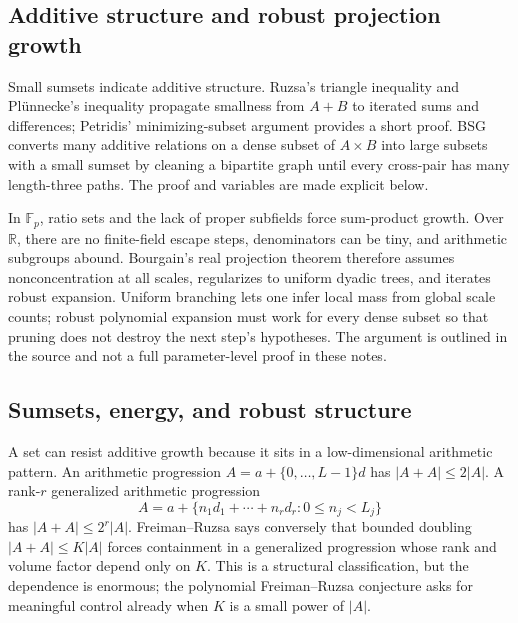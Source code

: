 \subsection{Additive structure and robust projection growth}\label{04-visual-computing-ii-ch033-additive-structure-and-robust-projection-growth}

Small sumsets indicate additive structure. Ruzsa's triangle inequality and Plünnecke's inequality propagate smallness from \(A+B\) to iterated sums and differences; Petridis' minimizing-subset argument provides a short proof. BSG converts many additive relations on a dense subset of \(A\times B\) into large subsets with a small sumset by cleaning a bipartite graph until every cross-pair has many length-three paths. The proof and variables are made explicit below.

In \(\mathbb F_p\), ratio sets and the lack of proper subfields force sum-product growth. Over \(\mathbb R\), there are no finite-field escape steps, denominators can be tiny, and arithmetic subgroups abound. Bourgain's real projection theorem therefore assumes nonconcentration at all scales, regularizes to uniform dyadic trees, and iterates robust expansion. Uniform branching lets one infer local mass from global scale counts; robust polynomial expansion must work for every dense subset so that pruning does not destroy the next step's hypotheses. The argument is outlined in the source and not a full parameter-level proof in these notes.

\subsection{Sumsets, energy, and robust structure}\label{04-visual-computing-ii-ch033-sumsets-energy-and-robust-structure}

A set can resist additive growth because it sits in a low-dimensional arithmetic pattern. An arithmetic progression \(A=a+\{0,\ldots,L-1\}d\) has \(|A+A|\le 2|A|\). A rank-\(r\) generalized arithmetic progression \[
A=a+\{n_1d_1+\cdots+n_rd_r:0\le n_j<L_j\}
\] has \(|A+A|\le 2^r|A|\). Freiman--Ruzsa says conversely that bounded doubling \(|A+A|\le K|A|\) forces containment in a generalized progression whose rank and volume factor depend only on \(K\). This is a structural classification, but the dependence is enormous; the polynomial Freiman--Ruzsa conjecture asks for meaningful control already when \(K\) is a small power of \(|A|\).

